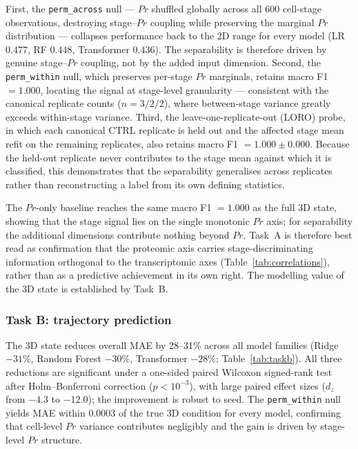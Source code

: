 \documentclass[5p,times,twocolumn]{elsarticle}
\begin{document}
First, the \texttt{perm\_across} null --- $Pr$ shuffled globally
across all 600 cell-stage observations, destroying stage--$Pr$
coupling while preserving the marginal $Pr$ distribution ---
collapses performance back to the 2D range for every model
(LR $0.477$, RF $0.448$, Transformer $0.436$).
The separability is therefore driven by genuine stage--$Pr$
coupling, not by the added input dimension.
Second, the \texttt{perm\_within} null, which preserves per-stage
$Pr$ marginals, retains macro F1 $= 1.000$, locating the signal
at stage-level granularity --- consistent with the canonical
replicate counts ($n = 3/2/2$), where between-stage variance
greatly exceeds within-stage variance.
Third, the leave-one-replicate-out (LORO) probe, in which each
canonical CTRL replicate is held out and the affected stage mean
refit on the remaining replicates, also retains macro F1
$= 1.000 \pm 0.000$.
Because the held-out replicate never contributes to the stage
mean against which it is classified, this demonstrates that the
separability generalises across replicates rather than
reconstructing a label from its own defining statistics.

The $Pr$-only baseline reaches the same macro F1 $= 1.000$ as
the full 3D state, showing that the stage signal lies on the
single monotonic $Pr$ axis; for separability the additional
dimensions contribute nothing beyond $Pr$.
Task~A is therefore best read as confirmation that the proteomic
axis carries stage-discriminating information orthogonal to the
transcriptomic axes (Table~\ref{tab:correlations}), rather than
as a predictive achievement in its own right.
The modelling value of the 3D state is established by Task~B.

\subsubsection{Task B: trajectory prediction}

The 3D state reduces overall MAE by 28--31\% across all model
families (Ridge $-31\%$, Random Forest $-30\%$, Transformer
$-28\%$; Table~\ref{tab:taskb}).
All three reductions are significant under a one-sided paired
Wilcoxon signed-rank test after Holm--Bonferroni correction
($p < 10^{-3}$), with large paired effect sizes
($d_{z}$ from $-4.3$ to $-12.0$); the improvement is robust to
seed.
The \texttt{perm\_within} null yields MAE within $0.0003$ of the
true 3D condition for every model, confirming that cell-level
$Pr$ variance contributes negligibly and the gain is driven by
stage-level $Pr$ structure.
\end{document}
